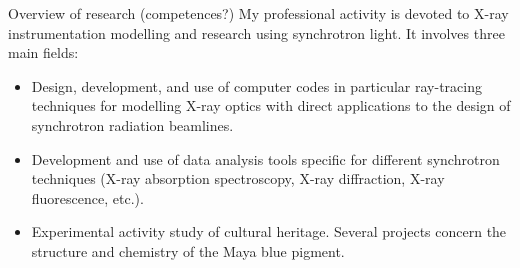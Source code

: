 


\prefix{}
\begin{rubric}{Overview of research (competences?)}
\entry*[]
    My professional activity is devoted to X-ray instrumentation modelling and research using synchrotron light. It involves three main fields:
    \begin{itemize}
        \item Design, development, and use of computer codes in particular ray-tracing techniques for modelling X-ray optics with direct applications to the design of synchrotron radiation beamlines.
        \item Development and use of data analysis tools 
    specific for different synchrotron techniques (X-ray absorption spectroscopy, X-ray diffraction, X-ray fluorescence, etc.).
        \item Experimental activity study of cultural heritage. Several projects concern the structure and chemistry of the Maya blue pigment.
    \end{itemize}
\end{rubric}